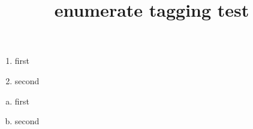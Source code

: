 \documentclass{article}
\title{enumerate tagging test}
\begin{document}
\begin{enumerate}
\item first
\item second
\end{enumerate}

\begin{enumerate}[a)]
\item first
\item second
\end{enumerate}
\end{document}
